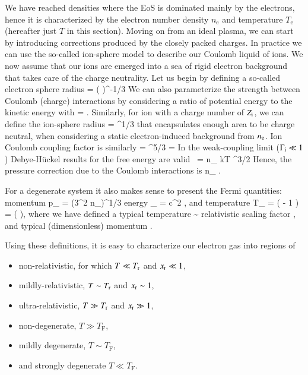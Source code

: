 We have reached densities where the EoS is dominated mainly by the electrons, hence it is characterized by the electron number density $n_{\mathrm{e}}$ and temperature $T_{\mathrm{e}}$ (hereafter just $T$ in this section).
Moving on from an ideal plasma, we can start by introducing corrections produced by the closely packed charges.
In practice we can use the so-called ion-sphere model to describe our Coulomb liquid of ions.
We now assume that our ions are emerged into a sea of rigid electron background that takes care of the charge neutrality.
Let us begin by defining a so-called electron sphere radius
\be
\erad = \left(  \right)^{-1/3}
\ee
We can also parameterize the strength between Coulomb (charge) interactions by considering a ratio of potential energy to the kinetic energy with
\be
\Ge = .
\ee
Similarly, for ion with a charge number of $Z_{\mathrm{i}}$, we can define the ion-sphere radius
\be
\irad = \erad \Zi^{1/3}
\ee
that encapsulates enough area to be charge neutral, when considering a static electron-induced background from $n_{\mathrm{e}}$.
Ion Coulomb coupling factor is similarly
\be
\Gi = \Ge \Zi^{5/3} = 
\ee
In the weak-coupling limit ($\Gamma_{\mathrm{i}} \ll 1$) Debye-H\"uckel results for the free energy are valid\cite{LL80}
\be
{} =  n_{} kT \Gamma^{3/2}
\ee
Hence, the pressure correction due to the Coulomb interactions is\cite{DeWitt96}
\be
\Pii {} n_{} .
\ee



For a degenerate system it also makes sense to present the Fermi quantities:
momentum
\be
p_{} = \hbar (3\pi^2 n_{})^{1/3}
\ee
energy
\be
\epsilon_{} = c^2 ,
\ee
and temperature
\be
T_{} =  \left(  - 1 \right)
= \Tr (  ),
\ee
where we have defined a typical temperature
\be
\Tr \equiv {} \sim {} \Kelvin
\ee
relativistic scaling factor
\be
\gammar \equiv {},
\ee
and typical (dimensionless) momentum
\be
\xr \equiv {}.
\ee

Using these definitions, it is easy to characterize our electron gas into regions of 
\begin{itemize}
    \item non-relativistic, for which $T \ll T_{\mathrm{r}}$ and $x_{\mathrm{r}} \ll 1$, 
    \item mildly-relativistic, $T \sim T_{\mathrm{r}}$ and $x_{\mathrm{r}} \sim 1$,
    \item ultra-relativistic, $T \gg T_{\mathrm{r}}$ and $x_{\mathrm{r}} \gg 1$,
    \item non-degenerate, $T \gg T_{\mathrm{F}}$,
    \item mildly degenerate, $T \sim T_{\mathrm{F}}$,
    \item and strongly degenerate $T \ll T_{\mathrm{F}}$.
\end{itemize}

